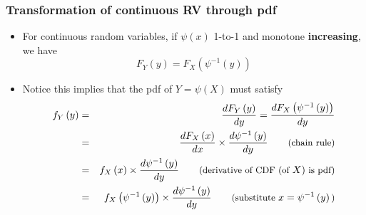 \documentclass[notes=show,smaller,handout]{beamer}
\newenvironment{stepitemize}{\begin{itemize}[<+->]}{\end{itemize} }
\begin{document}
\begin{frame}%

\frametitle{Transformation of continuous RV through pdf }

\begin{stepitemize}
\item For continuous random variables, if $\psi \left( x\right) $ 1-to-1 and
monotone \textbf{increasing}, we have%
\begin{equation*}
F_{Y}\left( y\right) =F_{X}\left( \psi ^{-1}\left( y\right) \right)
\end{equation*}

\item Notice this implies that the pdf of $Y=\psi \left( X\right) $ must
satisfy%
\begin{eqnarray*}
f_{Y}\left( y\right) &=&\frac{dF_{Y}\left( y\right) }{dy}=\frac{dF_{X}\left(
\psi ^{-1}\left( y\right) \right) }{dy} \\
&=&\frac{dF_{X}\left( x\right) }{dx}\times \frac{d\psi ^{-1}\left( y\right) 
}{dy}\qquad \text{{\small (chain rule)}} \\
&=&f_{X}\left( x\right) \times \frac{d\psi ^{-1}\left( y\right) }{dy}\qquad 
\text{{\small (derivative of CDF (of }}X\text{){\small \ is pdf)}} \\
&=&f_{X}\left( \psi ^{-1}\left( y\right) \right) \times \frac{d\psi
^{-1}\left( y\right) }{dy}\qquad \text{{\small (substitute }}x=\psi
^{-1}\left( y\right) \text{{\small )}}
\end{eqnarray*}
\end{stepitemize}

\end{frame}%
\end{document}
